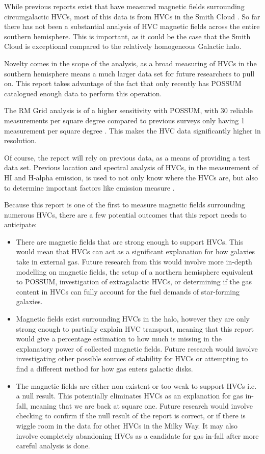 While previous reports exist that have measured magnetic fields surrounding circumgalactic HVCs, most of this data is from HVCs in the Smith Cloud \cite{ID2, ID5, ID23, ID26}. So far there has not been a substantial analysis of HVC magnetic fields  across the entire southern hemisphere. This is important, as it could be the case that the Smith Cloud is exceptional compared to the relatively homogeneous Galactic halo.

Novelty comes in the scope of the analysis, as a broad measuring of HVCs in the southern hemisphere means a much larger data set for future researchers to pull on. This report takes advantage of the fact that only recently has POSSUM catalogued enough data to perform this operation.

The RM Grid analysis is of a higher sensitivity with POSSUM, with 30 reliable measurements per square degree compared to previous surveys only having 1 measurement per square degree \cite{ID18, ID1}. This makes the HVC data significantly higher in resolution.

Of course, the report will rely on previous data, as a means of providing a test data set. Previous location and spectral analysis of HVCs, in the measurement of HI and H-alpha emission, is used to not only know where the HVCs are, but also to determine important factors like emission measure \cite{ID5, ID26, ID30}.

Because this report is one of the first to measure magnetic fields surrounding numerous HVCs, there are a few potential outcomes that this report needs to anticipate:
\begin{itemize}
\item There are magnetic fields that are strong enough to support HVCs. This would mean that HVCs can act as a significant explanation for how galaxies take in external gas. Future research from this would involve more in-depth modelling on magnetic fields, the setup of a northern hemisphere equivalent to POSSUM, investigation of extragalactic HVCs, or determining if the gas content in HVCs can fully account for the fuel demands of star-forming galaxies.
\item Magnetic fields exist surrounding HVCs in the halo, however they are only strong enough to partially explain HVC transport, meaning that this report would give a percentage estimation to how much is missing in the explanatory power of collected magnetic fields. Future research would involve investigating other possible sources of stability for HVCs or attempting to find a different method for how gas enters galactic disks.
\item The magnetic fields are either non-existent or too weak to support HVCs i.e. a null result. This potentially eliminates HVCs as an explanation for gas in-fall, meaning that we are back at square one. Future research would involve checking to confirm if the null result of the report is correct, or if there is wiggle room in the data for other HVCs in the Milky Way. It may also involve completely abandoning HVCs as a candidate for gas in-fall after more careful analysis is done.
\end{itemize}